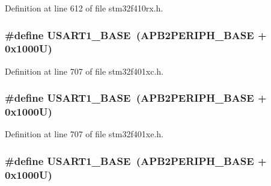 Definition at line 612 of file stm32f410rx.\+h.

\subsubsection[{\texorpdfstring{U\+S\+A\+R\+T1\+\_\+\+B\+A\+SE}{USART1_BASE}}]{\setlength{\rightskip}{0pt plus 5cm}\#define U\+S\+A\+R\+T1\+\_\+\+B\+A\+SE~({\bf A\+P\+B2\+P\+E\+R\+I\+P\+H\+\_\+\+B\+A\+SE} + 0x1000\+U)}\hypertarget{group___peripheral__registers__structures_ga86162ab3f740db9026c1320d46938b4d}{}\label{group___peripheral__registers__structures_ga86162ab3f740db9026c1320d46938b4d}


Definition at line 707 of file stm32f401xc.\+h.

\subsubsection[{\texorpdfstring{U\+S\+A\+R\+T1\+\_\+\+B\+A\+SE}{USART1_BASE}}]{\setlength{\rightskip}{0pt plus 5cm}\#define U\+S\+A\+R\+T1\+\_\+\+B\+A\+SE~({\bf A\+P\+B2\+P\+E\+R\+I\+P\+H\+\_\+\+B\+A\+SE} + 0x1000\+U)}\hypertarget{group___peripheral__registers__structures_ga86162ab3f740db9026c1320d46938b4d}{}\label{group___peripheral__registers__structures_ga86162ab3f740db9026c1320d46938b4d}


Definition at line 707 of file stm32f401xe.\+h.

\subsubsection[{\texorpdfstring{U\+S\+A\+R\+T1\+\_\+\+B\+A\+SE}{USART1_BASE}}]{\setlength{\rightskip}{0pt plus 5cm}\#define U\+S\+A\+R\+T1\+\_\+\+B\+A\+SE~({\bf A\+P\+B2\+P\+E\+R\+I\+P\+H\+\_\+\+B\+A\+SE} + 0x1000\+U)}\hypertarget{group___peripheral__registers__structures_ga86162ab3f740db9026c1320d46938b4d}{}\label{group___peripheral__registers__structures_ga86162ab3f740db9026c1320d46938b4d}


